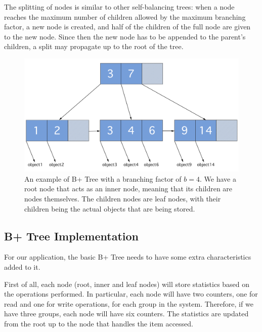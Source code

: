The splitting of nodes is similar to other self-balancing trees: when a node reaches the maximum number of children allowed by the maximum branching factor, a new node is created, and half of the children of the full node are given to the new node. Since then the new node has to be appended to the parent's children, a split may propagate up to the root of the tree.

\begin{figure}[!htb]
    \centering
    \includegraphics[width=\textwidth,height=\textheight,keepaspectratio]{img/b+tree.png}
    \caption[caption]{ An example of B+ Tree with a branching factor of $b=4$. We have a root node that acts as an inner node, meaning that its children are nodes themselves. The children nodes are leaf nodes, with their children being the actual objects that are being stored. }
    \label{fig:b+tree}
\end{figure}


\subsection{B+ Tree Implementation}\label{sec:b+tree-implementation}
For our application, the basic B+ Tree needs to have some extra characteristics added to it. 

First of all, each node (root, inner and leaf nodes) will store statistics based on the operations performed. In particular, each node will have two counters, one for read and one for write operations, for each group in the system. Therefore, if we have three groups, each node will have six counters. The statistics are updated from the root up to the node that handles the item accessed. 

